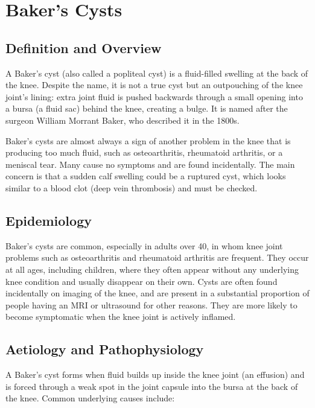 \chapter{Baker's Cysts}

\section*{Definition and Overview}
A Baker's cyst (also called a popliteal cyst) is a fluid-filled swelling at the back of the knee. Despite the name, it is not a true cyst but an outpouching of the knee joint's lining: extra joint fluid is pushed backwards through a small opening into a bursa (a fluid sac) behind the knee, creating a bulge. It is named after the surgeon William Morrant Baker, who described it in the 1800s.

Baker's cysts are almost always a sign of another problem in the knee that is producing too much fluid, such as osteoarthritis, rheumatoid arthritis, or a meniscal tear. Many cause no symptoms and are found incidentally. The main concern is that a sudden calf swelling could be a ruptured cyst, which looks similar to a blood clot (deep vein thrombosis) and must be checked.

\section*{Epidemiology}
Baker's cysts are common, especially in adults over 40, in whom knee joint problems such as osteoarthritis and rheumatoid arthritis are frequent. They occur at all ages, including children, where they often appear without any underlying knee condition and usually disappear on their own. Cysts are often found incidentally on imaging of the knee, and are present in a substantial proportion of people having an MRI or ultrasound for other reasons. They are more likely to become symptomatic when the knee joint is actively inflamed.

\section*{Aetiology and Pathophysiology}
A Baker's cyst forms when fluid builds up inside the knee joint (an effusion) and is forced through a weak spot in the joint capsule into the bursa at the back of the knee. Common underlying causes include:

